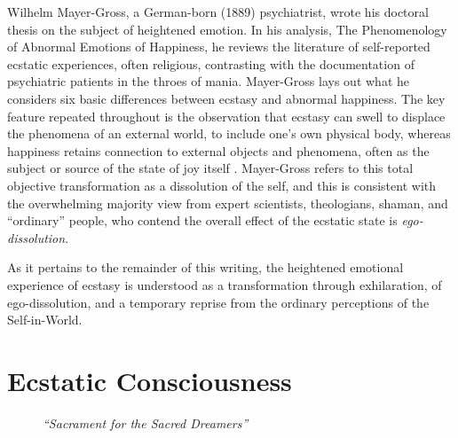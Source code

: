 \documentclass{UIdahoMastersThesis}
\begin{document}
Wilhelm Mayer-Gross, a German-born (1889) psychiatrist, wrote his doctoral thesis on the subject of heightened emotion. In his analysis, The Phenomenology of Abnormal Emotions of Happiness, he reviews the literature of self-reported ecstatic experiences, often religious, contrasting with the documentation of psychiatric patients in the throes of mania\cite{mayer-gross_translation:_nodate}.  Mayer-Gross lays out what he considers six basic differences between ecstasy and abnormal happiness. The key feature repeated throughout is the observation that ecstasy can swell to displace the phenomena of an external world, to include one's own physical body, whereas happiness retains connection to external objects and phenomena, often as the subject or source of the state of joy itself \cite{beer_nature_2000}. Mayer-Gross refers to this total objective transformation as a dissolution of the self, and this is consistent with the overwhelming majority view from expert scientists, theologians, shaman, and ``ordinary'' people, who contend the overall effect of the ecstatic state is \emph{ego-dissolution}.

As it pertains to the remainder of this writing, the heightened emotional experience of ecstasy is understood as a transformation through exhilaration, of ego-dissolution, and a temporary reprise from the ordinary perceptions of the Self-in-World.

\clearpage

\captionsetup{labelformat=empty}

\chapter{Ecstatic Consciousness}

\captionsetup{labelformat=empty}
\captionsetup{font=footnotesize}
\begin{figure}[h!]
	\centering
	\noindent
	{%
	\setlength{\fboxsep}{0pt}%
	\setlength{\fboxrule}{1.5pt}%
	}%
	\caption[Art by Cameron Gray, ``Sacrament for the Sacred Dreamers'']{\textit{``Sacrament for the Sacred Dreamers''}} 
	\label{fig:ch2}
\end{figure}
\captionsetup{labelformat=simple}
\captionsetup{font=small,labelfont=bf}
\end{document}
